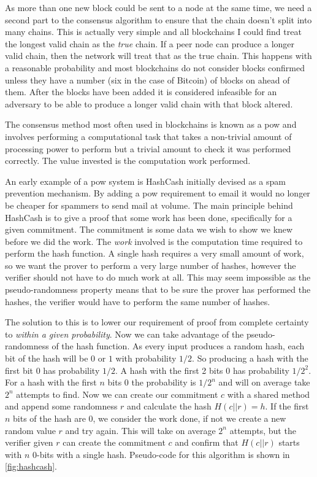 As more than one new block could be sent to a node at the same time, we need a second part to the consensus algorithm to ensure that the chain doesn't split into many chains. This is actually very simple and all blockchains I could find treat the longest valid chain as the \emph{true} chain. If a peer node can produce a longer valid chain, then the network will treat that as the true chain. This happens with a reasonable probability and most blockchains do not consider blocks confirmed unless they have a number (six in the case of Bitcoin) of blocks on ahead of them. After the blocks have been added it is considered infeasible for an adversary to be able to produce a longer valid chain with that block altered.

The consensus method most often used in blockchains is known as a \gls{pow} and involves performing a computational task that takes a non-trivial amount of processing power to perform but a trivial amount to check it was performed correctly. The value invested is the computation work performed.

An early example of a \gls{pow} system is HashCash \cite{backHashcashDenialService2002} initially devised as a spam prevention mechanism. By adding a \gls{pow} requirement to email it would no longer be cheaper for spammers to send mail at volume. The main principle behind HashCash is to give a proof that some work has been done, specifically for a given commitment. The commitment is some data we wish to show we knew before we did the work. The \emph{work} involved is the computation time required to perform the hash function. A single hash requires a very small amount of work, so we want the prover to perform a very large number of hashes, however the verifier should not have to do much work at all. This may seem impossible as the pseudo-randomness property means that to be sure the prover has performed the hashes, the verifier would have to perform the same number of hashes.

The solution to this is to lower our requirement of proof from complete certainty to \emph{within a given probability}. Now we can take advantage of the pseudo-randomness of the hash function. As every input produces a random hash, each bit of the hash will be $0$ or $1$ with probability $1/2$. So producing a hash with the first bit $0$ has probability $1/2$. A hash with the first 2 bits $0$ has probability $1/2^2$. For a hash with the first $n$ bits $0$ the probability is $1/2^n$ and will on average take $2^n$ attempts to find. Now we can create our commitment $c$ with a shared method and append some randomness $r$ and calculate the hash $H(c || r) = h$. If the first $n$ bits of the hash are 0, we consider the work done, if not we create a new random value $r$ and try again. This will take on average $2^n$ attempts, but the verifier given $r$ can create the commitment $c$ and confirm that $H(c || r)$ starts with $n$ 0-bits with a single hash. Pseudo-code for this algorithm is shown in \autoref{fig:hashcash}.

